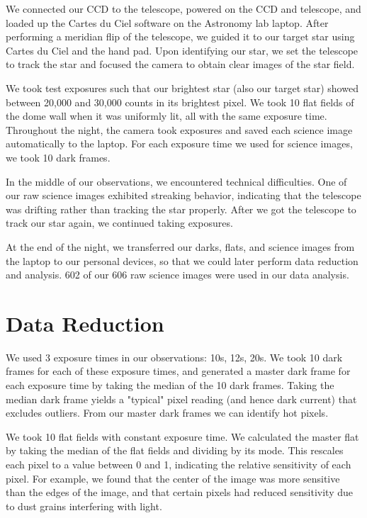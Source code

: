 \documentclass[twocolumn]{aastex631}
\begin{document}
We connected our CCD to the telescope, powered on the CCD and telescope, and loaded up the Cartes du Ciel software on the Astronomy lab laptop. After performing a meridian flip of the telescope, we guided it to our target star using Cartes du Ciel and the hand pad. Upon identifying our star, we set the telescope to track the star and focused the camera to obtain clear images of the star field.

We took test exposures such that our brightest star (also our target star) showed between 20,000 and 30,000 counts in its brightest pixel. We took 10 flat fields of the dome wall when it was uniformly lit, all with the same exposure time. Throughout the night, the camera took exposures and saved each science image automatically to the laptop. For each exposure time we used for science images, we took 10 dark frames.

In the middle of our observations, we encountered technical difficulties. One of our raw science images exhibited streaking behavior, indicating that the telescope was drifting rather than tracking the star properly. After we got the telescope to track our star again, we continued taking exposures.

At the end of the night, we transferred our darks, flats, and science images from the laptop to our personal devices, so that we could later perform data reduction and analysis. 602 of our 606 raw science images were used in our data analysis.

\section{Data Reduction} \label{sec:reduction}

We used 3 exposure times in our observations: 10s, 12s, 20s. We took 10 dark frames for each of these exposure times, and generated a master dark frame for each exposure time by taking the median of the 10 dark frames. Taking the median dark frame yields a "typical" pixel reading (and hence dark current) that excludes outliers. From our master dark frames we can identify hot pixels.

We took 10 flat fields with constant exposure time. We calculated the master flat by taking the median of the flat fields and dividing by its mode. This rescales each pixel to a value between 0 and 1, indicating the relative sensitivity of each pixel. For example, we found that the center of the image was more sensitive than the edges of the image, and that certain pixels had reduced sensitivity due to dust grains interfering with light.
\end{document}
